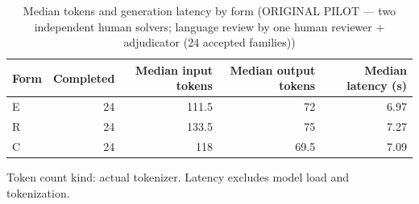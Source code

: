\begin{table}[t]
\centering
\small
\caption{Median tokens and generation latency by form (ORIGINAL PILOT --- two independent human solvers; language review by one human reviewer + adjudicator (24 accepted families))}
\label{tab:pilotorig-Qwen3-8B-resources}
\begin{tabular}{lrrrr}
\toprule
Form & Completed & Median input tokens & Median output tokens & Median latency (s) \\
\midrule
E & 24 & 111.5 & 72 & 6.97 \\
R & 24 & 133.5 & 75 & 7.27 \\
C & 24 & 118 & 69.5 & 7.09 \\
\bottomrule
\end{tabular}
\par\smallskip
\parbox{\linewidth}{\footnotesize Token count kind: actual tokenizer. Latency excludes model load and tokenization.}
\end{table}
